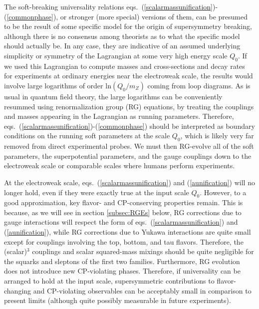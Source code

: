 \documentclass[11pt]{article}
\begin{document}
The soft-breaking universality relations
eqs.~(\ref{scalarmassunification})-(\ref{commonphase}), or stronger (more
special) versions of them, can be presumed to be the result of some
specific model for the origin of supersymmetry breaking, although there is
no consensus among theorists as to what the specific model
should actually be. In any case, they are indicative of an assumed
underlying simplicity or symmetry of the Lagrangian at some very high
energy scale $Q_0$. If we used this Lagrangian to compute masses and
cross-sections and decay rates for experiments at ordinary energies near
the electroweak scale, the results would involve large logarithms of order
ln$(Q_0/m_Z)$ coming from loop diagrams. As is usual in quantum field
theory, the large logarithms can be conveniently resummed using
renormalization group (RG) equations, by treating the couplings and masses
appearing in the Lagrangian as running parameters. Therefore,
eqs.~(\ref{scalarmassunification})-(\ref{commonphase}) should be
interpreted as boundary conditions on the running soft parameters at the
scale $Q_0$, which is likely very far removed from direct experimental
probes. We must then RG-evolve all of the soft parameters, the
superpotential parameters, and the gauge couplings down to the electroweak
scale or comparable scales where humans perform experiments. 

At the electroweak scale, eqs.~(\ref{scalarmassunification}) and
(\ref{aunification}) will no longer hold, even if they were exactly true
at the input scale $Q_0$.  However, to a good approximation, key flavor-
and CP-conserving properties remain. This is because, as we will see in
section \ref{subsec:RGEs} below, RG corrections due to gauge interactions
will respect the form of
eqs.~(\ref{scalarmassunification}) and (\ref{aunification}),
while RG corrections due to Yukawa interactions are quite small except for
couplings involving the top, bottom, and tau flavors. Therefore, the
(scalar)$^3$ couplings and scalar squared-mass mixings should be quite
negligible for the squarks and sleptons of the first two families.
Furthermore, RG evolution does not introduce new CP-violating phases.
Therefore, if universality can be arranged to hold at the input scale,
supersymmetric contributions to flavor-changing and CP-violating
observables can be acceptably small in comparison to present limits
(although quite possibly measurable in future experiments). 
\end{document}
